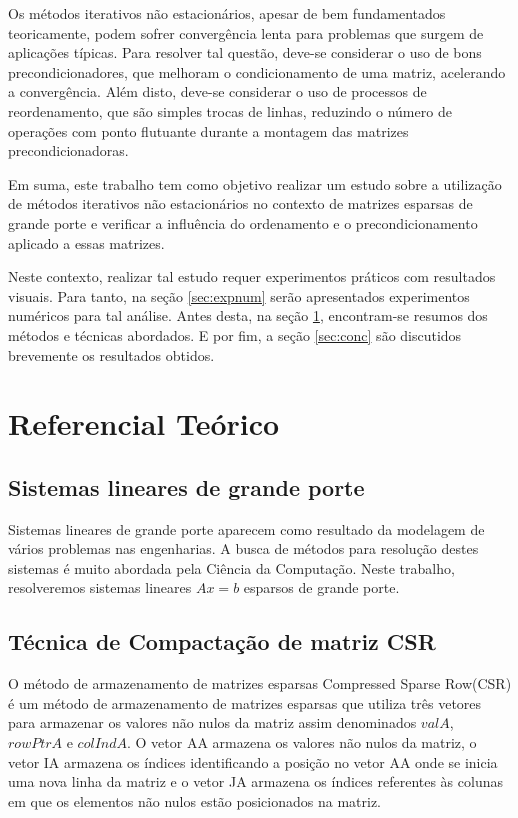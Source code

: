 \documentclass[
	11pt,				%
	oneside,			%
	a4paper,			%
	english,			%
	brazil,				%
	]{article}
\begin{document}
Os métodos iterativos não estacionários, apesar de bem fundamentados teoricamente, podem sofrer convergência lenta para problemas que surgem de aplicações típicas. Para resolver tal questão, deve-se considerar o uso de bons precondicionadores, que melhoram o condicionamento de uma matriz, acelerando a convergência. Além disto, deve-se considerar o uso de processos de reordenamento, que são simples trocas de linhas, reduzindo o número de operações com ponto flutuante durante a montagem das matrizes precondicionadoras.

Em suma, este trabalho tem como objetivo realizar um estudo sobre a utilização de métodos iterativos não estacionários no contexto de matrizes esparsas de grande porte e verificar a influência do ordenamento e o precondicionamento aplicado a essas matrizes.

Neste contexto, realizar tal estudo requer experimentos práticos com resultados visuais. Para tanto, na seção \ref{sec:expnum} serão apresentados experimentos numéricos para tal análise. Antes desta, na seção \ref{sec:refteo}, encontram-se resumos dos métodos e técnicas abordados. E por fim, a seção \ref{sec:conc} são discutidos brevemente os resultados obtidos.

\section{Referencial Teórico} \label{sec:refteo}

\subsection{Sistemas lineares de grande porte}
Sistemas lineares de grande porte aparecem como resultado da modelagem de vários problemas nas engenharias. A busca de métodos para resolução destes sistemas é muito abordada pela Ciência da Computação. Neste trabalho, resolveremos sistemas lineares $Ax = b$ esparsos de grande porte.

\subsection{Técnica de Compactação de matriz CSR}
O método de armazenamento de matrizes esparsas Compressed Sparse Row(CSR) é um método de armazenamento de matrizes esparsas que utiliza três vetores para armazenar os valores não nulos da matriz assim denominados $valA$, $rowPtrA$ e $colIndA$. O vetor AA armazena os valores não nulos da matriz, o vetor IA armazena os índices identificando a posição no vetor AA onde se inicia uma nova linha da matriz e o vetor JA armazena os índices referentes às colunas em que os elementos não nulos estão posicionados na matriz.
\end{document}
